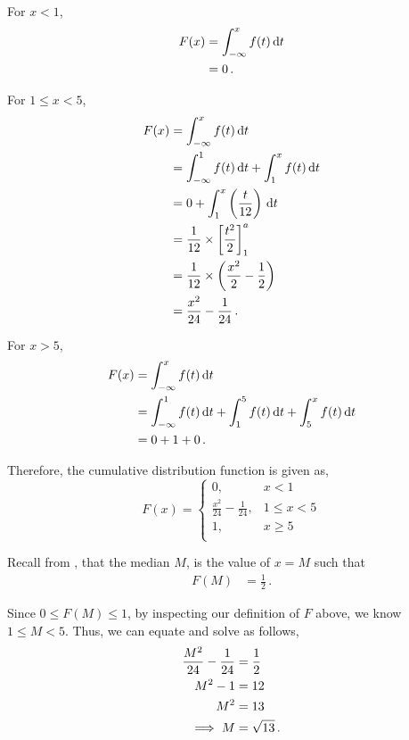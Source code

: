 \begin{subquestions}
For $x < 1$,
\begin{align}
	F(x) &= \int_{-\infty}^x f(t)\,\mathrm{d} t \nonumber \\
			&= 0 \,.
\end{align}

For $1\leq x < 5$,
\begin{align}
	F(x) &= \int_{-\infty}^x f(t)\,\mathrm{d} t \nonumber \\
		  &= \int_{-\infty}^1 f(t)\,\mathrm{d} t + \int_{1}^x f(t)\,\mathrm{d} t \nonumber \\
		  &= 0 + \int_{1}^{x} \left(\frac{t}{12} \right)\,\mathrm{d} t \nonumber \\
	     & = \frac{1}{12} \times \left[ \frac{t^2}{2} \right]^a_1 \nonumber \\
	     & = \frac{1}{12} \times \left(\frac{x^2}{2} - \frac{1}{2}\right) \nonumber \\
	     & = \frac{x^2}{24} - \frac{1}{24} \,.
\end{align}

For $x>5$,
\begin{align}
	F(x) &= \int_{-\infty}^x f(t)\,\mathrm{d} t \nonumber \\
		  &= \int_{-\infty}^1 f(t)\,\mathrm{d} t + \int_{1}^5 f(t)\,\mathrm{d} t+ \int_{5}^x f(t)\,\mathrm{d} t \nonumber \\
		  &= 0 + 1 + 0 \,.
\end{align}

Therefore, the cumulative distribution function is given as,
\begin{equation}
F(x) = \begin{cases}
	 0, & x < 1 \\
	\frac{x^2}{24}-\frac{1}{24}, & 1\leq x < 5 \\
	1, & x\geq 5 \\ 
\end{cases}
\end{equation}


\subquestion

Recall from , that the median $M$, is the value of $x = M$ such that
\begin{align}
	F(M) & = \frac{1}{2} \,.
\end{align}

Since $0 \leq F(M) \leq 1$, by inspecting our definition of $F$ above, we know $1 \leq M < 5$. Thus, we can equate and solve as follows,
\begin{align}
	\frac{M^2}{24}-\frac{1}{24} & = \frac{1}{2} \nonumber \\
	M^2 - 1 & = 12 \nonumber \\
	M^2 & = 13 \nonumber \\
	\implies M & = \sqrt{13} \,.
\end{align}


\end{subquestions}
